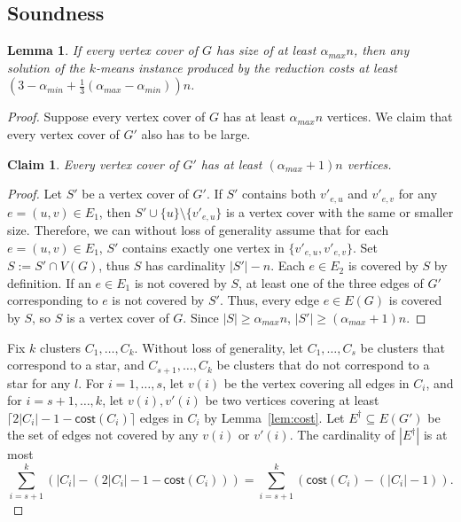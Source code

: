 \documentclass{scrartcl}
\newtheorem{lemma}[theorem]{Lemma}
\newtheorem{claim}[theorem]{Claim}
\newcommand{\cost}{\mathsf{cost}}
\begin{document}
\subsection{Soundness} \begin{lemma}
If every vertex cover of $G$ has size of at least $\alpha_{max} n$, then any solution of the $k$-means instance produced by the reduction costs at least $(3 - \alpha_{min} + \frac{1}{3}(\alpha_{max} - \alpha_{min}))n$.
\end{lemma}
\begin{proof}
Suppose every vertex cover of $G$ has at least $\alpha_{max} n$ vertices. We claim that every vertex cover of $G'$ also has to be large. 
\begin{claim}
Every vertex cover of $G'$ has at least $(\alpha_{max} + 1)n$ vertices. 
\end{claim}
\begin{proof}
Let $S'$ be a vertex cover of $G'$. If $S'$ contains both $v'_{e, u}$ and $v'_{e, v}$ for any $e = (u, v) \in E_1$, 
then $S' \cup \{ u \} \setminus \{ v'_{e, u} \}$ is a vertex cover with the same or smaller size.
Therefore, we can without loss of generality assume that for each $e = (u, v) \in E_1$, $S'$ contains exactly one vertex in $\{ v'_{e, u}, v'_{e, v} \}$. 
Set $S := S' \cap V(G)$, thus $S$ has cardinality $|S'| - n$. 
Each $e \in E_2$ is covered by $S$ by definition. If an $e \in E_1$ is not covered by $S$, at least one of the three edges of $G'$ corresponding to $e$ is not covered by $S'$. 
Thus, every edge $e \in E(G)$ is covered by $S$, so $S$ is a vertex cover of $G$. Since $|S| \geq \alpha_{max}n$, $|S'| \geq (\alpha_{max} + 1)n$. 
\end{proof}



Fix $k$ clusters $C_1, \dots, C_k$. 
Without loss of generality, let $C_1, \dots, C_s$ be clusters that correspond to a star, and $C_{s + 1}, \dots, C_k$ be clusters that do not correspond to a star for any $l$. 
For $i = 1, \dots, s$, let $v(i)$ be the vertex covering all edges in $C_i$, and for $i = s+1, \dots, k$, let $v(i), v'(i)$ be two vertices covering at least $\lceil 2|C_i| - 1 - \cost(C_i) \rceil$ edges in $C_i$ by Lemma~\ref{lem:cost}. 
Let $E^{\dagger} \subseteq E(G')$ be the set of edges not covered by any $v(i)$ or $v'(i)$. 
The cardinality of $|E^{\dagger}|$ is at most 
\[
\sum_{i = s +1}^k (|C_i| - (2|C_i| - 1 - \cost(C_i))) = 
\sum_{i = s +1}^k (\cost(C_i) - (|C_i| - 1)). 
\]


\end{proof}
\end{document}
